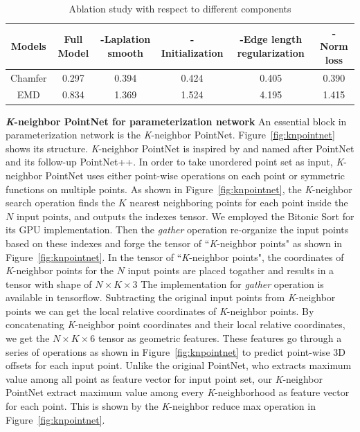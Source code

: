  \begin{table}
 	\caption{Ablation study with respect to different components}
 	\label{tab:ablation}
 	\centering
 	\begin{tabular}{c | c c c c c}
 		Models &  Full Model & -Laplation smooth & -Initialization & -Edge length regularization & -Norm loss \\
 		\hline
 		Chamfer      & 0.297  & 0.394 & 0.424 & 0.405  & 0.390\\
 		EMD			 & 0.834  & 1.369 & 1.524 & 4.195  & 1.415
 	\end{tabular}
 \end{table}
\noindent\textbf{\textit{K}-neighbor PointNet for parameterization network} An essential block in parameterization network is the \textit{K}-neighbor PointNet.
%
Figure~\ref{fig:knpointnet} shows its structure. 
\textit{K}-neighbor PointNet is inspired by and named after PointNet\cite{PointNet} and its follow-up PointNet++\cite{NIPS2017_7095}. 
%
In order to take unordered point set as input, \textit{K}-neighbor PointNet uses either point-wise operations on each point or symmetric functions on multiple points. 
As shown in Figure~\ref{fig:knpointnet}, the \textit{K}-neighbor search operation finds the $K$ nearest neighboring points for each point inside the $N$ input points, and outputs the indexes tensor. 
We employed the Bitonic Sort\cite{bitonicsorter} for its GPU implementation. 
Then the \emph{gather} operation re-organize the input points based on these indexes and forge the tensor of ``\textit{K}-neighbor points" as shown in Figure~\ref{fig:knpointnet}. In the tensor of ``\textit{K}-neighbor points", the coordinates of \textit{K}-neighbor
points for the $N$ input points are placed togather and results in a tensor with shape of $N\times K\times3$ 
%
The implementation for \emph{gather} operation is available in tensorflow.
Subtracting the original input points from \textit{K}-neighbor points we can get the local relative coordinates of \textit{K}-neighbor points. 
By concatenating \textit{K}-neighbor point coordinates and their local relative coordinates, we get the $N\times K\times6$ tensor as geometric features. 
%
These features go through a series of operations as shown in Figure~\ref{fig:knpointnet} to predict point-wise 3D offsets for each input point. Unlike the original PointNet\cite{PointNet}, who extracts maximum value among all point as feature vector for input point set, our \textit{K}-neighbor PointNet extract maximum value among every \textit{K}-neighborhood as feature vector for each point. This is shown by the \textit{K}-neighbor reduce max operation in Figure~\ref{fig:knpointnet}.
 

